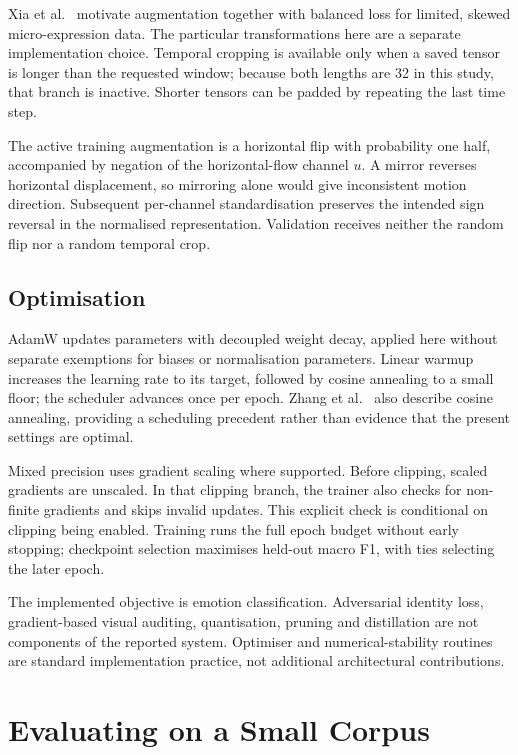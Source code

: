 Xia et al.~\cite{xia2020a} motivate augmentation together with balanced loss for limited, skewed micro-expression data. The particular transformations here are a separate implementation choice. Temporal cropping is available only when a saved tensor is longer than the requested window; because both lengths are 32 in this study, that branch is inactive. Shorter tensors can be padded by repeating the last time step.

The active training augmentation is a horizontal flip with probability one half, accompanied by negation of the horizontal-flow channel $u$. A mirror reverses horizontal displacement, so mirroring alone would give inconsistent motion direction. Subsequent per-channel standardisation preserves the intended sign reversal in the normalised representation. Validation receives neither the random flip nor a random temporal crop.

\subsection{Optimisation}
\label{sec:optimisation}

AdamW updates parameters with decoupled weight decay, applied here without separate exemptions for biases or normalisation parameters. Linear warmup increases the learning rate to its target, followed by cosine annealing to a small floor; the scheduler advances once per epoch. Zhang et al.~\cite{zhang2022} also describe cosine annealing, providing a scheduling precedent rather than evidence that the present settings are optimal.

Mixed precision uses gradient scaling where supported. Before clipping, scaled gradients are unscaled. In that clipping branch, the trainer also checks for non-finite gradients and skips invalid updates. This explicit check is conditional on clipping being enabled. Training runs the full epoch budget without early stopping; checkpoint selection maximises held-out macro F1, with ties selecting the later epoch.

The implemented objective is emotion classification. Adversarial identity loss, gradient-based visual auditing, quantisation, pruning and distillation are not components of the reported system. Optimiser and numerical-stability routines are standard implementation practice, not additional architectural contributions.

\section{Evaluating on a Small Corpus}
\label{sec:evaluation}

